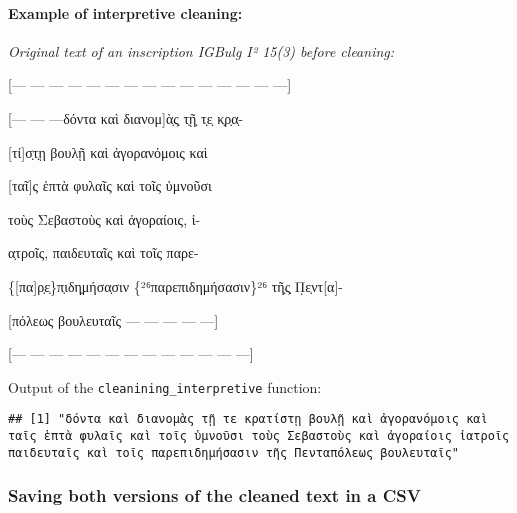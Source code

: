 \documentclass[]{article}
\newenvironment{Shaded}{\begin{snugshade}}{\end{snugshade}}
\newcommand{\DecValTok}[1]{\textcolor[rgb]{0.00,0.00,0.81}{#1}}
\newcommand{\KeywordTok}[1]{\textcolor[rgb]{0.13,0.29,0.53}{\textbf{#1}}}
\newcommand{\NormalTok}[1]{#1}
\newcommand{\OperatorTok}[1]{\textcolor[rgb]{0.81,0.36,0.00}{\textbf{#1}}}
\newcommand{\StringTok}[1]{\textcolor[rgb]{0.31,0.60,0.02}{#1}}
\let\oldparagraph\paragraph
\renewcommand{\paragraph}[1]{\oldparagraph{#1}\mbox{}}
\begin{document}
\hypertarget{example-of-interpretive-cleaning}{%
\paragraph{Example of interpretive
cleaning:}\label{example-of-interpretive-cleaning}}

\emph{Original text of an inscription IGBulg I² 15(3) before cleaning:}

{[}--- --- --- --- --- --- --- --- --- --- --- --- --- --- ---{]}

{[}--- --- ---δόντα καὶ διανομ{]}ὰ̣ς̣ τ̣ῇ̣ τ̣ε̣ κ̣ρ̣α̣-

{[}τί{]}σ̣τ̣ῃ βουλῇ καὶ ἀγορανόμοις καὶ

{[}ταῖ{]}ς ἑπτὰ φυλαῖς καὶ τοῖς ὑμνοῦσι

τοὺς Σεβαστοὺς καὶ ἀγοραίοις, ἰ-

α̣τροῖς, παιδευταῖς καὶ τοῖς παρε-

\{{[}πα{]}ρ̣ε̣\}π̣ιδη̣μήσα̣σιν \{²⁶παρεπιδημήσασιν\}²⁶ τῆ̣ς̣ Π̣ε̣ντ{[}α{]}-

{[}πόλεως βουλευταῖς --- --- --- --- ---{]}

{[}--- --- --- --- --- --- --- --- --- --- --- --- ---{]}

Output of the \texttt{cleanining\_interpretive} function:

\begin{Shaded}
\end{Shaded}

\begin{verbatim}
## [1] "δόντα καὶ διανομὰς τῇ τε κρατίστῃ βουλῇ καὶ ἀγορανόμοις καὶ ταῖς ἑπτὰ φυλαῖς καὶ τοῖς ὑμνοῦσι τοὺς Σεβαστοὺς καὶ ἀγοραίοις ἰατροῖς παιδευταῖς καὶ τοῖς παρεπιδημήσασιν τῆς Πενταπόλεως βουλευταῖς"
\end{verbatim}

\hypertarget{saving-both-versions-of-the-cleaned-text-in-a-csv}{%
\subsubsection{Saving both versions of the cleaned text in a
CSV}\label{saving-both-versions-of-the-cleaned-text-in-a-csv}}
\end{document}
